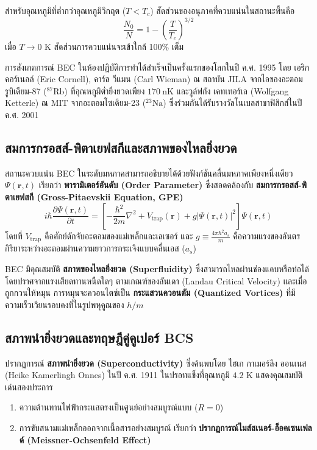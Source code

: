 สำหรับอุณหภูมิที่ต่ำกว่าอุณหภูมิวิกฤต ($T < T_c$) สัดส่วนของอนุภาคที่ควบแน่นในสถานะพื้นคือ
\begin{equation}
\frac{N_0}{N} = 1 - \left( \frac{T}{T_c} \right)^{3/2}
\label{eq:bec_condensate_fraction}
\end{equation}
เมื่อ $T \to 0\text{ K}$ สัดส่วนการควบแน่นจะเข้าใกล้ 100\% เต็ม

การสังเกตการณ์ BEC ในห้องปฏิบัติการทำได้สำเร็จเป็นครั้งแรกของโลกในปี ค.ศ. 1995 โดย เอริก คอร์เนลล์ (Eric Cornell), คาร์ล วีแมน (Carl Wieman) ณ สถาบัน JILA จากไอของอะตอมรูบิเดียม-87 ($^{87}\text{Rb}$) ที่อุณหภูมิต่ำยิ่งยวดเพียง $170~\text{nK}$ และวูล์ฟกัง เคทเทอร์เล (Wolfgang Ketterle) ณ MIT จากอะตอมโซเดียม-23 ($^{23}\text{Na}$) ซึ่งร่วมกันได้รับรางวัลโนเบลสาขาฟิสิกส์ในปี ค.ศ. 2001

\subsection{สมการกรอสส์-พิตาเยฟสกีและสภาพของไหลยิ่งยวด}
สถานะควบแน่น BEC ในระดับมหภาคสามารถอธิบายได้ด้วยฟังก์ชันคลื่นมหภาคเพียงหนึ่งเดียว $\Psi(\mathbf{r}, t)$ เรียกว่า \textbf{พารามิเตอร์อันดับ (Order Parameter)} ซึ่งสอดคล้องกับ \textbf{สมการกรอสส์-พิตาเยฟสกี (Gross-Pitaevskii Equation, GPE)}
\begin{equation}
i\hbar \frac{\partial \Psi(\mathbf{r}, t)}{\partial t} = \left[ -\frac{\hbar^2}{2m} \nabla^2 + V_{\text{trap}}(\mathbf{r}) + g |\Psi(\mathbf{r}, t)|^2 \right] \Psi(\mathbf{r}, t)
\label{eq:gross_pitaevskii_eq}
\end{equation}
โดยที่ $V_{\text{trap}}$ คือศักย์ดักจับอะตอมของแม่เหล็กและเลเซอร์ และ $g \equiv \frac{4\pi\hbar^2 a_s}{m}$ คือความแรงของอันตรกิริยาระหว่างอะตอมผ่านความยาวการกระเจิงแบบคลื่นเอส ($a_s$)

BEC มีคุณสมบัติ \textbf{สภาพของไหลยิ่งยวด (Superfluidity)} ซึ่งสามารถไหลผ่านช่องแคบหรือท่อได้โดยปราศจากแรงเสียดทานหนืดใดๆ ตามเกณฑ์ของลันเดา (Landau Critical Velocity) และเมื่อถูกกวนให้หมุน การหมุนจะควอนไตซ์เป็น \textbf{กระแสวนควอนตัม (Quantized Vortices)} ที่มีความเร็วเวียนรอบคงที่ในรูปพหุคูณของ $h/m$

\subsection{สภาพนำยิ่งยวดและทฤษฎีคู่คูเปอร์ BCS}
ปรากฏการณ์ \textbf{สภาพนำยิ่งยวด (Superconductivity)} ซึ่งค้นพบโดย ไฮเก กาเมอร์ลิง ออนเนส (Heike Kamerlingh Onnes) ในปี ค.ศ. 1911 ในปรอทแข็งที่อุณหภูมิ $4.2\text{ K}$ แสดงคุณสมบัติเด่นสองประการ
\begin{enumerate}
    \item ความต้านทานไฟฟ้ากระแสตรงเป็นศูนย์อย่างสมบูรณ์แบบ ($R = 0$)
    \item การขับสนามแม่เหล็กออกจากเนื้อสารอย่างสมบูรณ์ เรียกว่า \textbf{ปรากฏการณ์ไมส์สเนอร์-อ็อคเซนเฟลด์ (Meissner-Ochsenfeld Effect)}
\end{enumerate}

